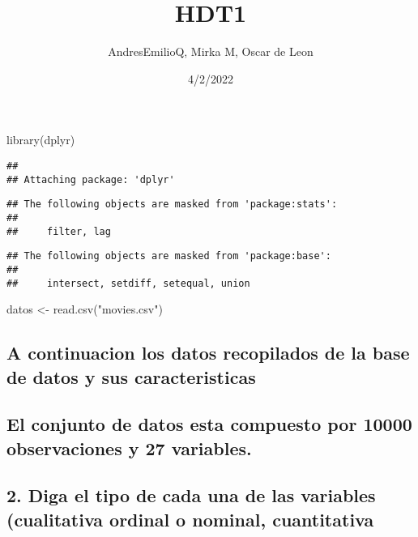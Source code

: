 \documentclass[
]{article}
\title{HDT1}
\author{AndresEmilioQ, Mirka M, Oscar de Leon}
\date{4/2/2022}
\newenvironment{Shaded}{\begin{snugshade}}{\end{snugshade}}
\newcommand{\FunctionTok}[1]{\textcolor[rgb]{0.00,0.00,0.00}{#1}}
\newcommand{\NormalTok}[1]{#1}
\newcommand{\OtherTok}[1]{\textcolor[rgb]{0.56,0.35,0.01}{#1}}
\newcommand{\StringTok}[1]{\textcolor[rgb]{0.31,0.60,0.02}{#1}}
\begin{document}
\maketitle

\begin{Shaded}
\begin{Highlighting}[]
\FunctionTok{library}\NormalTok{(dplyr)}
\end{Highlighting}
\end{Shaded}

\begin{verbatim}
## 
## Attaching package: 'dplyr'
\end{verbatim}

\begin{verbatim}
## The following objects are masked from 'package:stats':
## 
##     filter, lag
\end{verbatim}

\begin{verbatim}
## The following objects are masked from 'package:base':
## 
##     intersect, setdiff, setequal, union
\end{verbatim}

\begin{Shaded}
\begin{Highlighting}[]
\NormalTok{datos }\OtherTok{\textless{}{-}} \FunctionTok{read.csv}\NormalTok{(}\StringTok{"movies.csv"}\NormalTok{)}
\end{Highlighting}
\end{Shaded}

\hypertarget{a-continuacion-los-datos-recopilados-de-la-base-de-datos-y-sus-caracteristicas}{%
\subsection{A continuacion los datos recopilados de la base de datos y
sus
caracteristicas}\label{a-continuacion-los-datos-recopilados-de-la-base-de-datos-y-sus-caracteristicas}}

\hypertarget{el-conjunto-de-datos-esta-compuesto-por-10000-observaciones-y-27-variables.}{%
\subsection{El conjunto de datos esta compuesto por 10000 observaciones
y 27
variables.}\label{el-conjunto-de-datos-esta-compuesto-por-10000-observaciones-y-27-variables.}}

\hypertarget{diga-el-tipo-de-cada-una-de-las-variables-cualitativa-ordinal-o-nominal-cuantitativa}{%
\subsection{2. Diga el tipo de cada una de las variables (cualitativa
ordinal o nominal,
cuantitativa}\label{diga-el-tipo-de-cada-una-de-las-variables-cualitativa-ordinal-o-nominal-cuantitativa}}
\end{document}
